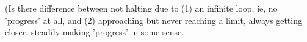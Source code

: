 \cite{wiki:FinitistSetTheory}

\cite{wiki:ConstructiveSetTheory}

\setcounter{currentlevel}{\value{baseSectionLevel}}

(Is there difference between 
not halting due to (1) an infinite loop, ie,
no 'progress' at all,
and (2) approaching but never reaching a limit,
always getting closer, steadily making 'progress' in some sense.
